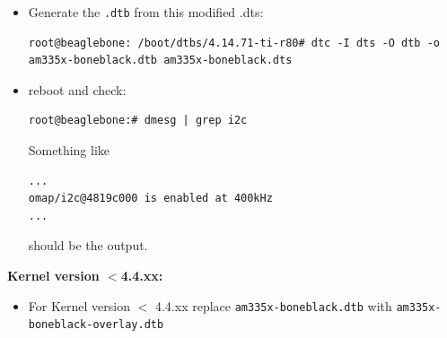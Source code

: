 \documentclass[
	fontsize=10pt
	paper=a4
]{scrartcl}
\begin{document}
\begin{itemize}
\item Generate the \texttt{.dtb} from this modified .dts:
\begin{lstlisting}
root@beaglebone: /boot/dtbs/4.14.71-ti-r80# dtc -I dts -O dtb -o am335x-boneblack.dtb am335x-boneblack.dts
\end{lstlisting}

\item reboot and check:
\begin{lstlisting}
root@beaglebone:# dmesg | grep i2c
\end{lstlisting}
Something like
\begin{lstlisting}
... 
omap/i2c@4819c000 is enabled at 400kHz
...
\end{lstlisting}
should be the output.


\end{itemize}



\textbf{Kernel version $<$4.4.xx:}
\begin{itemize}
\item For Kernel version $<$ 4.4.xx replace \texttt{am335x-boneblack.dtb} with \texttt{am335x-boneblack-overlay.dtb}
\end{itemize}
\end{document}

